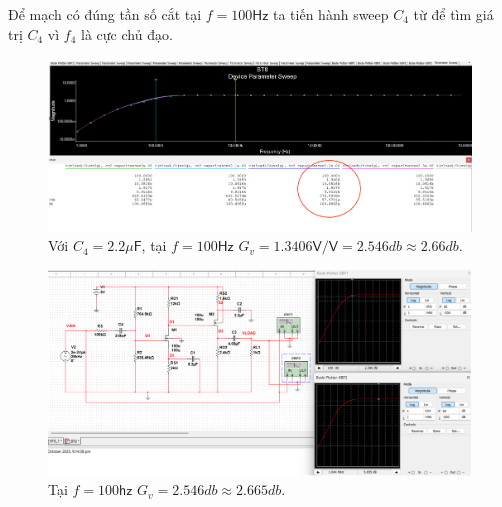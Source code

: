Để mạch có đúng tần số cắt tại $f = 100 \textsf{Hz}$ ta tiến hành sweep $C_{4}$ từ để tìm giá trị $C_{4}$ vì $f_{4}$ là cực chủ đạo.

\begin{figure}[H]
	\centering
	\includegraphics[width=.9\linewidth]{./my-chapters/my-images/Question8/d_ketqua2.png}
	\caption{Với $C_{4} = 2.2 \mu\textsf{F}$, tại $f = 100 \textsf{Hz}$ $G_{v} = 1.3406 \textsf{V/V} = 2.546db \approx 2.66db$.}
\end{figure}

\begin{figure}[H]
	\centering
	\includegraphics[width=.9\linewidth]{./my-chapters/my-images/Question8/d_ketqua3.png}
	\caption{Tại $f = 100 \textsf{hz}$ $G_{v} = 2.546 db \approx 2.665 db$.}
\end{figure}